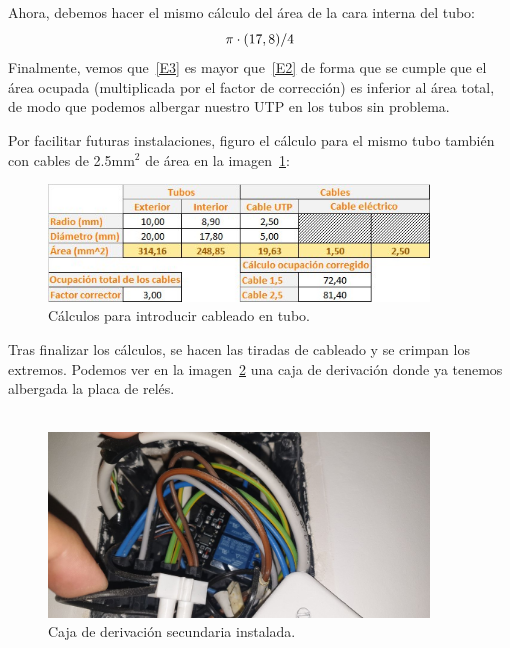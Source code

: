 Ahora, debemos hacer el mismo cálculo del área de la cara interna del tubo:
\begin{equation}
\centering
\pi \cdot (17,8)/4
\end{equation}\label{E3}
Finalmente, vemos que~\ref{E3} es mayor que~\ref{E2} de forma que se cumple que el área ocupada (multiplicada por el factor de corrección) es inferior al área total, de modo que podemos albergar nuestro UTP en los tubos sin problema.

Por facilitar futuras instalaciones, figuro el cálculo para el mismo tubo también con cables de 2.5mm$^{2}$ de área en la imagen~\ref{Img:Calculo}:

\begin{figure}[h]
    \centering
    \includegraphics[width=0.9\textwidth]{img/Diagramas/calculo cables.jpeg}
    \caption{Cálculos para introducir cableado en tubo.} \label{Img:Calculo}
\end{figure}

Tras finalizar los cálculos, se hacen las tiradas de cableado y se crimpan los extremos. Podemos ver en la imagen~\ref{Img:CajaDerivacion} una caja de derivación donde ya tenemos albergada la placa de relés.~\\~\\

\begin{figure}[h]
    \centering
    \includegraphics[width=0.9\textwidth]{img/fotos/caja-persiana.jpeg}
    \caption{Caja de derivación secundaria instalada.} \label{Img:CajaDerivacion}
\end{figure}

